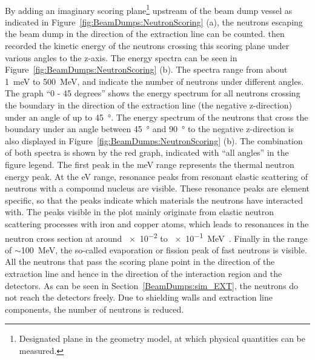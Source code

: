\\By adding an imaginary scoring plane\footnote{Designated plane in the \fluka geometry model, at which physical quantities can be measured.} upstream of the beam dump vessel as indicated in Figure~\ref{fig:BeamDumps:NeutronScoring} (a), the neutrons escaping the beam dump in the direction of the extraction line can be counted.
\fluka then recorded the kinetic energy of the neutrons crossing this scoring plane under various angles to the z-axis.
The energy spectra can be seen in Figure~\ref{fig:BeamDumps:NeutronScoring} (b).
The spectra range from about \SI{1}{\meV} to \SI{500}{\MeV}, and indicate the number of neutrons under different angles. 
The graph ``0 - 45 degrees'' shows the energy spectrum for all neutrons crossing the boundary in the direction of the extraction line (the negative z-direction) under an angle of up to \SI{45}{\degree}.
The energy spectrum of the neutrons that cross the boundary under an angle between \SI{45}{\degree} and \SI{90}{\degree} to the negative z-direction is also displayed in Figure~\ref{fig:BeamDumps:NeutronScoring} (b).
The combination of both spectra is shown by the red graph, indicated with ``all angles'' in the figure legend.
The first peak in the meV range represents the thermal neutron energy peak.
At the eV range, resonance peaks from resonant elastic scattering of neutrons with a compound nucleus are visible.
These resonance peaks are element specific, so that the peaks indicate which materials the neutrons have interacted with.
The peaks visible in the plot mainly originate from elastic neutron scattering processes with iron and copper atoms, which leads to resonances in the neutron cross section at around \num{e-2} to \SI{e-1}{\MeV}~\cite{neutron_resonances,neutron_resonances2}.
Finally in the range of $\sim$\SI{100}{\MeV}, the so-called evaporation or fission peak of fast neutrons is visible.
\\All the neutrons that pass the scoring plane point in the direction of the extraction line and hence in the direction of the interaction region and the detectors.
As can be seen in Section~\ref{BeamDumps:sim_EXT}, the neutrons do not reach the detectors freely.
Due to shielding walls and extraction line components, the number of neutrons is reduced.
